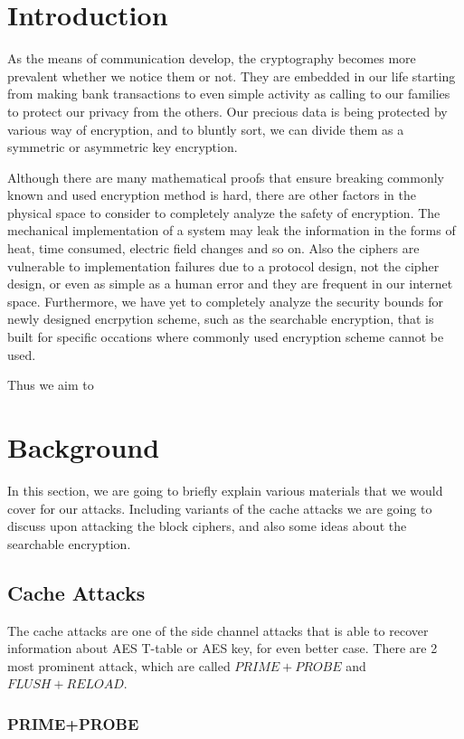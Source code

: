 \documentclass[a4paper]{article}
\begin{document}
\section{Introduction}

As the means of communication develop, the cryptography becomes more prevalent whether we notice them or not. They are embedded in our life starting from making bank transactions to even simple activity as calling to our families to protect our privacy from the others. Our precious data is being protected by various way of encryption, and to bluntly sort, we can divide them as a symmetric or asymmetric key encryption.
\par Although there are many mathematical proofs that ensure breaking commonly known and used encryption method is hard, there are other factors in the physical space to consider to completely analyze the safety of encryption. The mechanical implementation of a system may leak the information in the forms of heat, time consumed, electric field changes and so on. Also the ciphers are vulnerable to implementation failures due to a protocol design, not the cipher design, or even as simple as a human error and they are frequent in our internet space. Furthermore, we have yet to completely analyze the security bounds for newly designed encrpytion scheme, such as the searchable encryption, that is built for specific occations where commonly used encryption scheme cannot be used.
\par Thus we aim to 

\section{Background}

In this section, we are going to briefly explain various materials that we would cover for our attacks. Including variants of the cache attacks we are going to discuss upon attacking the block ciphers, and also some ideas about the searchable encryption.

\subsection{Cache Attacks}

The cache attacks are one of the side channel attacks that is able to recover information about AES T-table or AES key, for even better case. There are 2 most prominent attack, which are called $PRIME+PROBE$ and $FLUSH+RELOAD$.

\subsubsection{PRIME+PROBE}
\end{document}
